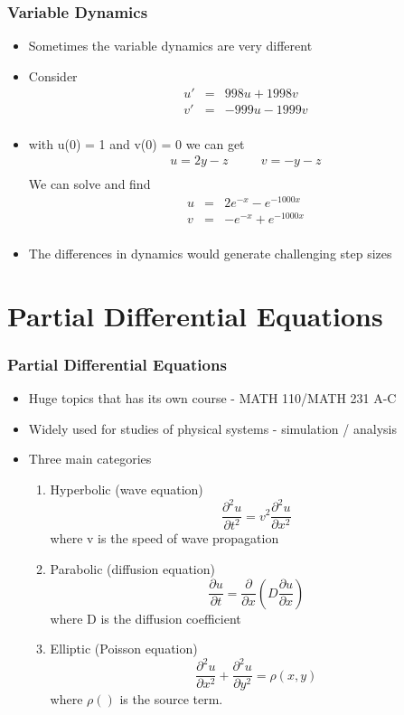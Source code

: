 \documentclass[10pt]{beamer}
\begin{document}
\begin{frame}
  \frametitle{Variable Dynamics}
  \begin{itemize}
  \item Sometimes the variable dynamics are very different
  \item Consider
    \[
      \begin{array}{rcl}
        u' & = & 998 u + 1998 v\\
        v' & = & -999u - 1999 v\\
      \end{array}
    \]
  \item with u(0) = 1 and v(0) = 0 we can get
    \[
      \begin{array}{rcl}
        u = 2 y - z & \mbox{~~~}& v = -y -z \\
      \end{array}
    \]
    We can solve and find
    \[
      \begin{array}{rcl}
        u & = & 2 e^{-x} - e^{-1000x}\\
        v & = & - e^{-x} + e^{-1000x}\\
      \end{array}
    \]
  \item The differences in dynamics would generate challenging step sizes
  \end{itemize}
\end{frame}

\section{Partial Differential Equations}
\label{sec:part-diff-equat}

\begin{frame}
  \frametitle{Partial Differential Equations}
  \begin{itemize}
  \item Huge topics that has its own course - MATH 110/MATH 231 A-C
  \item Widely used for studies of physical systems - simulation / analysis
  \item Three main categories
    \begin{enumerate}
    \item Hyperbolic (wave equation)
      \[
        \frac{\partial^2 u}{\partial t^2} = v^2 \frac{\partial^2 u}{\partial x^2}
      \] where v is the speed of wave propagation
    \item Parabolic (diffusion equation)
      \[
        \frac{\partial u}{\partial t} = \frac{\partial}{\partial x}\left( D \frac{\partial  u}{\partial x} \right)
      \]
      where D is the diffusion coefficient
    \item Elliptic (Poisson equation)
      \[
        \frac{\partial^2 u }{\partial x^2} +  \frac{\partial^2 u }{\partial y^2} = \rho(x,y)
      \]
      where $\rho()$ is the source term. 
    \end{enumerate}
  \end{itemize}
\end{frame}
\end{document}
